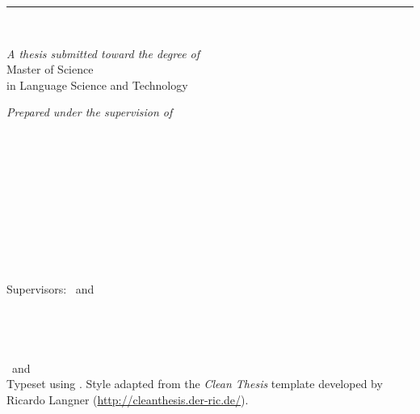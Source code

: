 %
\begin{titlepage}
	\tgherosfont
	\flushright
	\hfill
	\vfill
	
	{\color{ctcolormain}
	{\LARGE\textbf{\thesisTitle}} \par
	{\Large \thesisSubtitle} \par
	} %
	
	\rule[5pt]{\textwidth}{.4pt} \par
	
	{\LARGE \authorName} \\[2mm]

	\vfill
	
	
	\textit{A thesis submitted toward the degree of} \\[1mm]
	{\Large Master of Science} \\[1mm]
	{\large in Language Science and Technology} \\	
	
	\vfill	
	
	\textit{Prepared under the supervision of} \\
	\thesisFirstSupervisor \\
	\thesisSecondSupervisor 
	
	\vfill
	
	
	{\Large \thesisUniversity} \\[2mm]
	{\large \thesisUniversityDepartment} \\
	
	\vfill
	
	\thesisDate \\
	
\end{titlepage}


\hfill
\vfill
\small
{\tgherosfont \textbf{\authorName}} \\
\texttt{\authorContact}\\
\textit{\thesisTitle} \\
\thesisDate \\
Supervisors: \thesisFirstSupervisor\ and \thesisSecondSupervisor \\

{\tgherosfont \textbf{\thesisUniversity}} \\
\thesisUniversityDepartment \\
\thesisUniversityInstitute \\
\thesisUniversityStreetAddress \\
\thesisUniversityPostalCode\ and \thesisUniversityCity \\[1.5em]

Typeset using \LaTeXe.
Style adapted from the \textit{Clean Thesis} template developed by Ricardo Langner (\url{http://cleanthesis.der-ric.de/}).
